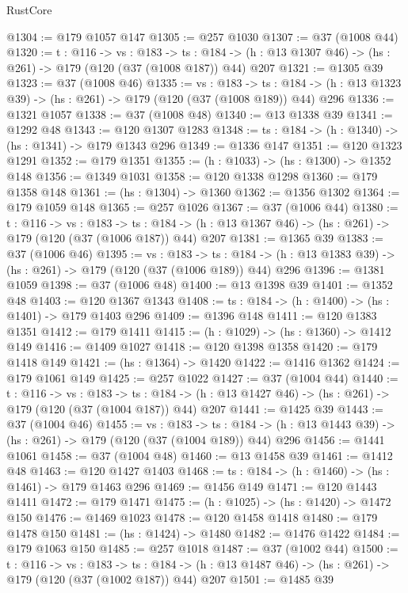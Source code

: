 \begin{lexlean}{RustCore}
\begin{coremodule}
@1304 := @179 @1057 @147
@1305 := @257 @1030
@1307 := @37 (@1008 @44)
@1320 := {t : @116} ->
  {vs : @183} ->
  {ts : @184} -> (h : @13 @1307 @46) -> (hs : @261) -> @179 (@120 (@37 (@1008 @187)) @44) @207
@1321 := @1305 @39
@1323 := @37 (@1008 @46)
@1335 := {vs : @183} ->
  {ts : @184} -> (h : @13 @1323 @39) -> (hs : @261) -> @179 (@120 (@37 (@1008 @189)) @44) @296
@1336 := @1321 @1057
@1338 := @37 (@1008 @48)
@1340 := @13 @1338 @39
@1341 := @1292 @48
@1343 := @120 @1307 @1283
@1348 := {ts : @184} -> (h : @1340) -> (hs : @1341) -> @179 @1343 @296
@1349 := @1336 @147
@1351 := @120 @1323 @1291
@1352 := @179 @1351
@1355 := (h : @1033) -> (hs : @1300) -> @1352 @148
@1356 := @1349 @1031
@1358 := @120 @1338 @1298
@1360 := @179 @1358 @148
@1361 := (hs : @1304) -> @1360
@1362 := @1356 @1302
@1364 := @179 @1059 @148
@1365 := @257 @1026
@1367 := @37 (@1006 @44)
@1380 := {t : @116} ->
  {vs : @183} ->
  {ts : @184} -> (h : @13 @1367 @46) -> (hs : @261) -> @179 (@120 (@37 (@1006 @187)) @44) @207
@1381 := @1365 @39
@1383 := @37 (@1006 @46)
@1395 := {vs : @183} ->
  {ts : @184} -> (h : @13 @1383 @39) -> (hs : @261) -> @179 (@120 (@37 (@1006 @189)) @44) @296
@1396 := @1381 @1059
@1398 := @37 (@1006 @48)
@1400 := @13 @1398 @39
@1401 := @1352 @48
@1403 := @120 @1367 @1343
@1408 := {ts : @184} -> (h : @1400) -> (hs : @1401) -> @179 @1403 @296
@1409 := @1396 @148
@1411 := @120 @1383 @1351
@1412 := @179 @1411
@1415 := (h : @1029) -> (hs : @1360) -> @1412 @149
@1416 := @1409 @1027
@1418 := @120 @1398 @1358
@1420 := @179 @1418 @149
@1421 := (hs : @1364) -> @1420
@1422 := @1416 @1362
@1424 := @179 @1061 @149
@1425 := @257 @1022
@1427 := @37 (@1004 @44)
@1440 := {t : @116} ->
  {vs : @183} ->
  {ts : @184} -> (h : @13 @1427 @46) -> (hs : @261) -> @179 (@120 (@37 (@1004 @187)) @44) @207
@1441 := @1425 @39
@1443 := @37 (@1004 @46)
@1455 := {vs : @183} ->
  {ts : @184} -> (h : @13 @1443 @39) -> (hs : @261) -> @179 (@120 (@37 (@1004 @189)) @44) @296
@1456 := @1441 @1061
@1458 := @37 (@1004 @48)
@1460 := @13 @1458 @39
@1461 := @1412 @48
@1463 := @120 @1427 @1403
@1468 := {ts : @184} -> (h : @1460) -> (hs : @1461) -> @179 @1463 @296
@1469 := @1456 @149
@1471 := @120 @1443 @1411
@1472 := @179 @1471
@1475 := (h : @1025) -> (hs : @1420) -> @1472 @150
@1476 := @1469 @1023
@1478 := @120 @1458 @1418
@1480 := @179 @1478 @150
@1481 := (hs : @1424) -> @1480
@1482 := @1476 @1422
@1484 := @179 @1063 @150
@1485 := @257 @1018
@1487 := @37 (@1002 @44)
@1500 := {t : @116} ->
  {vs : @183} ->
  {ts : @184} -> (h : @13 @1487 @46) -> (hs : @261) -> @179 (@120 (@37 (@1002 @187)) @44) @207
@1501 := @1485 @39

\end{coremodule}
\end{lexlean}
